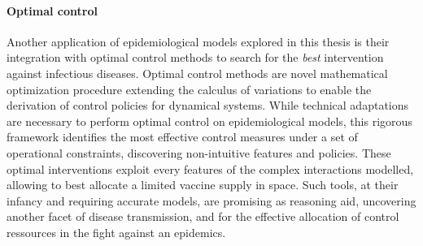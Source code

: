\paragraph{Optimal control} Another application of epidemiological models explored in this thesis is their integration with optimal control methods to search for the \textit{best} intervention against infectious diseases. Optimal control methods are novel mathematical optimization procedure extending the calculus of variations to enable the derivation of control policies for dynamical systems. While technical adaptations are necessary to perform optimal control on epidemiological models, this rigorous framework identifies the most effective control measures under a set of operational constraints, discovering non-intuitive features and policies. These optimal interventions exploit every features of the complex interactions modelled, allowing to \eg best allocate a limited vaccine supply in space. Such tools, at their infancy and requiring accurate models, are promising as reasoning aid, uncovering another facet of disease transmission, and for the effective allocation of control ressources in the fight against an epidemics.




